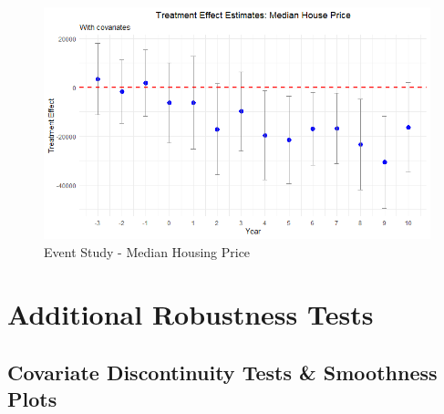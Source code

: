 \begin{figure}[htbp]
    \centering
    \includegraphics[width=\textwidth,keepaspectratio]{images/tes_gs.png}
    \caption{Event Study - Median Housing Price}
    \label{fig:tes_gs_app}
\end{figure}

\clearpage



\clearpage

\section{Additional Robustness Tests} \label{sec:appxb}

\subsection{Covariate Discontinuity Tests \& Smoothness Plots}

